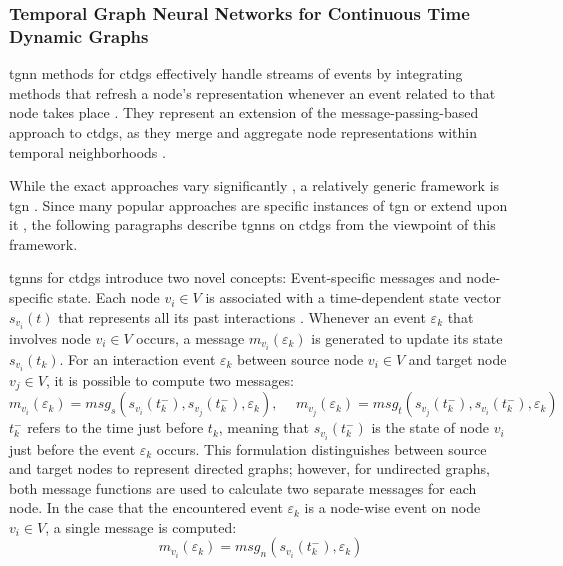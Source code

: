 \subsubsection{Temporal Graph Neural Networks for Continuous Time Dynamic Graphs}
\label{s_tgnns_for_ctdgs}
\gls{tgnn} methods for \glspl{ctdg} effectively handle streams of events by integrating methods that refresh a node's representation whenever an event related to that node takes place \cite{longa_graph_2023}. They represent an extension of the message-passing-based approach to \glspl{ctdg}, as they merge and aggregate node representations within temporal neighborhoods \cite{longa_graph_2023}.

While the exact approaches vary significantly \cite{longa_graph_2023}, a relatively generic framework is \gls{tgn} \cite{rossi_temporal_2020}. Since many popular approaches are specific instances of \gls{tgn} \cite{rossi_temporal_2020} or extend upon it \cite{souza_provably_2022}, the following paragraphs describe \glspl{tgnn} on \glspl{ctdg} from the viewpoint of this framework.

\glspl{tgnn} for \glspl{ctdg} introduce two novel concepts: 
Event-specific messages and node-specific state. 
Each node $v_i \in V$ is associated with a time-dependent state vector $s_{v_i}(t)$ that represents all its past interactions \cite{longa_graph_2023}. Whenever an event $\varepsilon_{k}$ that involves node $v_i \in V$ occurs, a message $m_{v_i}(\varepsilon_{k})$ is generated to update its state $s_{v_i}(t_k)$. For an interaction event $\varepsilon_{k}$ between source node $v_i \in V$ and target node $v_j \in V$, it is possible to compute two messages:
\begin{equation}
    m_{v_i}(\varepsilon_{k}) = msg_s(s_{v_i}(t_k^-), s_{v_j}(t_k^-), \varepsilon_{k}), \hspace{15pt} m_{v_j}(\varepsilon_{k}) = msg_t(s_{v_j}(t_k^-), s_{v_i}(t_k^-), \varepsilon_{k})
\end{equation}
$t_k^-$ refers to the time just before $t_k$, meaning that $s_{v_i}(t_k^-)$ is the state of node $v_i$ just before the event $\varepsilon_{k}$ occurs. This formulation distinguishes between source and target nodes to represent directed graphs; however, for undirected graphs, both message functions are used to calculate two separate messages for each node. In the case that the encountered event $\varepsilon_{k}$ is a node-wise event on node $v_i \in V$, a single message is computed:
\begin{equation}
    m_{v_i}(\varepsilon_{k}) = msg_n(s_{v_i}(t_k^-), \varepsilon_{k})
\end{equation}

